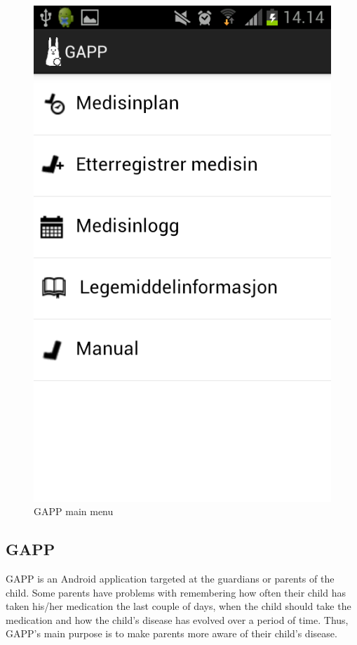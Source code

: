 \begin{figure}[H]
\begin{minipage}[b]{0.4\linewidth}
		\includegraphics[width=0.20\paperwidth]{Pictures/app-screenshots/gapp_main_menu.png}
		\caption{GAPP main menu}
		\label{fig:gapp-main-menu1}
	\end{minipage}
\end{figure}


\subsection{GAPP}
\label{sec:description-gapp}
GAPP is an Android application targeted at the guardians or parents of the child. 
Some parents have problems with remembering how often their child has taken his/her medication the last couple of days, when the child should take the medication and how the child's disease has evolved over a period of time. Thus, GAPP's main purpose is to make parents more aware of their child's disease.   


